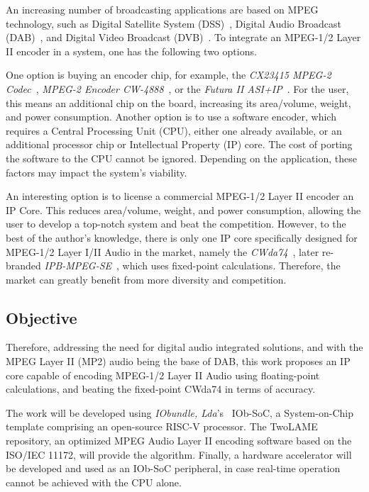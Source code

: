 An increasing number of broadcasting applications are based on MPEG technology,
such as Digital Satellite System (DSS)~\cite{dss}, Digital Audio Broadcast
(DAB)~\cite{dab}, and Digital Video Broadcast (DVB)~\cite{dvb}. To integrate an
MPEG-1/2 Layer II encoder in a system, one has the following two options.

One option is buying an encoder chip, for example, the \textit{CX23415 MPEG-2
  Codec}~\cite{cx23415}, \textit{MPEG-2 Encoder CW-4888}~\cite{cw4888}, or the
\textit{Futura II ASI+IP}~\cite{futura}. For the user, this means an additional
chip on the board, increasing its area/volume, weight, and power
consumption. Another option is to use a software encoder, which requires a
Central Processing Unit (CPU), either one already available, or an additional
processor chip or Intellectual Property (IP) core. The cost of porting the
software to the CPU cannot be ignored. Depending on the application, these
factors may impact the system's viability.

An interesting option is to license a commercial MPEG-1/2 Layer II encoder an IP
Core. This reduces area/volume, weight, and power consumption, allowing the user
to develop a top-notch system and beat the competition. However, to the best of
the author's knowledge, there is only one IP core specifically designed for
MPEG-1/2 Layer I/II Audio in the market, namely the \textit{CWda74}~\cite{xxxx},
later re-branded \textit{IPB-MPEG-SE}~\cite{xxxx}, which uses fixed-point
calculations. Therefore, the market can greatly benefit from more diversity and
competition.

\subsection{Objective}

Therefore, addressing the need for digital audio integrated solutions, and with
the MPEG Layer II (MP2) audio being the base of DAB, this work proposes an IP
core capable of encoding MPEG-1/2 Layer II Audio using floating-point
calculations, and beating the fixed-point CWda74 in terms of accuracy.

The work will be developed using \textit{IObundle, Lda}'s~\cite{iobundle}
IOb-SoC, a System-on-Chip template comprising an open-source RISC-V
processor. The TwoLAME~\cite{twolame} repository, an optimized MPEG Audio Layer
II encoding software based on the ISO/IEC 11172, will provide the
algorithm. Finally, a hardware accelerator will be developed and used as an
IOb-SoC peripheral, in case real-time operation cannot be achieved with the CPU
alone.

